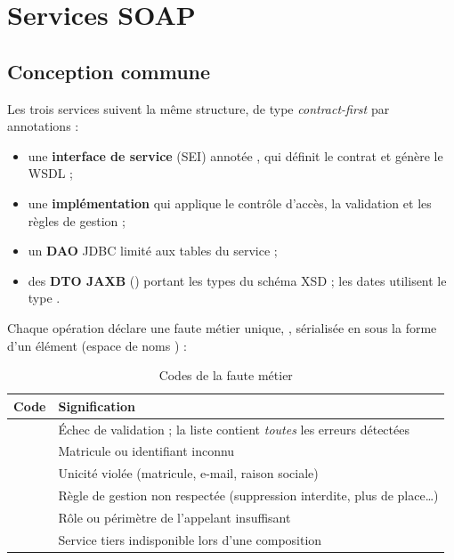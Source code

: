 \chapter{Services SOAP}\label{chap:soap}

\section{Conception commune}
Les trois services suivent la même structure, de type \emph{contract-first} par annotations :
\begin{itemize}
  \item une \textbf{interface de service} (SEI) annotée , qui définit le contrat et génère le WSDL ;
  \item une \textbf{implémentation} qui applique le contrôle d'accès, la validation et les règles de gestion ;
  \item un \textbf{DAO} JDBC limité aux tables du service ;
  \item des \textbf{DTO JAXB} () portant les types du schéma XSD ; les dates utilisent le type .
\end{itemize}

Chaque opération déclare une faute métier unique, , sérialisée en  sous la forme
d'un élément  (espace de noms ) :

\begin{table}[htbp]
\centering
\caption{Codes de la faute métier }\label{tab:faults}
\begin{tabularx}{\textwidth}{@{}lY@{}}
\toprule
\textbf{Code} & \textbf{Signification} \\
\midrule
{} & Échec de validation ; la liste  contient \emph{toutes} les erreurs détectées \\
 & Matricule ou identifiant inconnu \\
 & Unicité violée (matricule, e-mail, raison sociale) \\
 & Règle de gestion non respectée (suppression interdite, plus de place…) \\
 & Rôle ou périmètre de l'appelant insuffisant \\
 & Service tiers indisponible lors d'une composition \\
\bottomrule
\end{tabularx}
\end{table}


